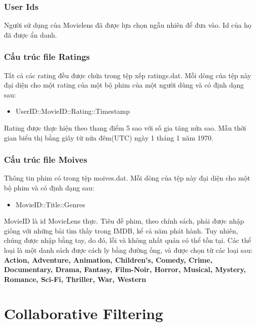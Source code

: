 \documentclass[a4paper,11pt]{report}
\begin{document}
\subsection{User Ids}
Người sử dụng của Movielens đã được lựa chọn ngẫu nhiên để đưa vào. Id của họ đã được ẩn danh. 
\subsection{Cấu trúc file Ratings}
Tất cả các rating đều được chứa trong tệp xếp ratings.dat. Mỗi dòng của tệp này đại diện cho một rating của một bộ phim của một người dùng và có định dạng sau:
\begin{itemize}
\item[] UserID::MovieID::Rating::Timestamp
\end{itemize}
Rating được thực hiện theo thang điểm 5 sao với số gia tăng nửa sao. Mẫu thời gian biểu thị bằng giây từ nửa đêm(UTC) ngày 1 tháng 1 năm 1970.
\newpage
\subsection{Cấu trúc file Moives}
Thông tin phim có trong tệp moives.dat. Mỗi dòng của tệp này đại diện cho một bộ phim và có định dạng sau:
\begin{itemize}
\item[] MovieID::Title::Genres
\end{itemize}
MovieID là id MovieLens thực. Tiêu đề phim, theo chính sách, phải được nhập giống với những bài tìm thấy trong IMDB, kể cả năm phát hành. Tuy nhiên, chúng được nhập bằng tay, do đó, lỗi và không nhất quán có thể tồn tại. Các thể loại là một danh sách được cách ly bằng đường ống, và được chọn từ các loại sau: \textbf{Action, Adventure, Animation, Children's, Comedy, Crime, Documentary, Drama, Fantasy, Film-Noir, Horror, Musical, Mystery, Romance, Sci-Fi, Thriller, War, Western}
\chapter{Collaborative Filtering}
\end{document}
